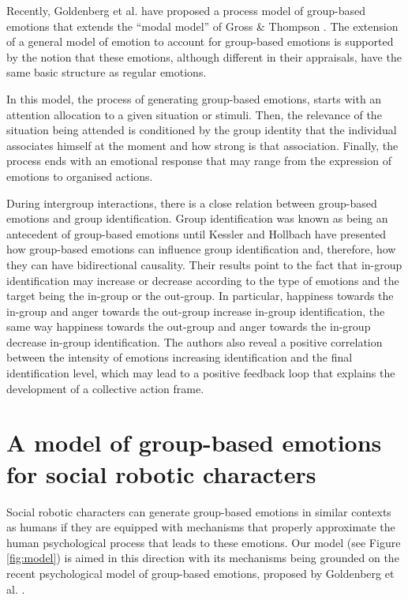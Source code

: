 Recently, Goldenberg et al. have proposed a process model of group-based emotions  \cite{goldenberg2016process} that extends the ``modal model'' of Gross \& Thompson \cite{Gross2007}. The extension of a general model of emotion to account for group-based emotions is supported by the notion that these emotions, although different in their appraisals, have the same basic structure as regular emotions. 

In this model, the process of generating group-based emotions, starts with an attention allocation to a given situation or stimuli. Then, the relevance of the situation being attended is conditioned by the group identity that the individual associates himself at the moment and how strong is that association. Finally, the process ends with an emotional response that may range from the expression of emotions to organised actions.

During intergroup interactions, there is a close relation between group-based emotions and group identification. Group identification was known as being an antecedent of group-based emotions until Kessler and Hollbach \cite{kessler2005group} have presented how group-based emotions can influence group identification and, therefore, how they can have bidirectional causality. Their results point to the fact that in-group identification may increase or decrease according to the type of emotions and the target being the in-group or the out-group. In particular, happiness towards the in-group and anger towards the out-group increase in-group identification, the same way happiness towards the out-group and anger towards the in-group decrease in-group identification. The authors also reveal a positive correlation between the intensity of emotions increasing identification and the final identification level, which may lead to a positive feedback loop that explains the development of a collective action frame.

\section{A model of group-based emotions for social robotic characters}
\label{sec:model}

Social robotic characters can generate group-based emotions in similar contexts as humans if they are equipped with mechanisms that properly approximate the human psychological process that leads to these emotions. Our model (see Figure \ref{fig:model}) is aimed in this direction with its mechanisms being grounded on the recent psychological model of group-based emotions, proposed by Goldenberg et al. \cite{goldenberg2016process}.

